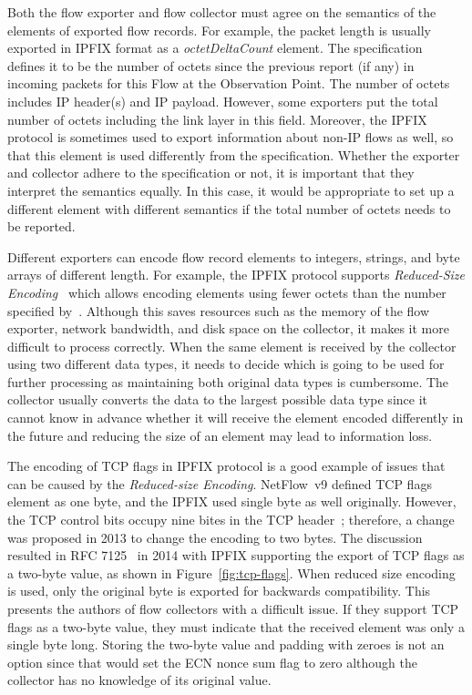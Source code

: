 Both the flow exporter and flow collector must agree on the semantics of the elements of exported flow records. For example, the packet length is usually exported in IPFIX format as a \emph{octetDeltaCount} element. The specification~\cite{IANA-2017-IP} defines it to be the number of octets since the previous report (if any) in incoming packets for this Flow at the Observation Point. The number of octets includes IP header(s) and IP payload. However, some exporters put the total number of octets including the link layer in this field. Moreover, the IPFIX protocol is sometimes used to export information about non-IP flows as well, so that this element is used differently from the specification. Whether the exporter and collector adhere to the specification or not, it is important that they interpret the semantics equally. In this case, it would be appropriate to set up a different element with different semantics if the total number of octets needs to be reported.

Different exporters can encode flow record elements to integers, strings, and byte arrays of different length. For example, the IPFIX protocol supports \emph{Reduced-Size Encoding}~\cite{rfc7011} which allows encoding elements using fewer octets than the number specified by~\cite{IANA-2017-IP}. Although this saves resources such as the memory of the flow exporter, network bandwidth, and disk space on the collector, it makes it more difficult to process correctly. When the same element is received by the collector using two different data types, it needs to decide which is going to be used for further processing as maintaining both original data types is cumbersome. The collector usually converts the data to the largest possible data type since it cannot know in advance whether it will receive the element encoded differently in the future and reducing the size of an element may lead to information loss.

The encoding of TCP flags in IPFIX protocol is a good example of issues that can be caused by the \emph{Reduced-size Encoding}. NetFlow~v9 defined TCP flags element as one byte, and the IPFIX used single byte as well originally. However, the TCP control bits occupy nine bites in the TCP header~\cite{rfc3540}; therefore, a change was proposed in 2013 to change the encoding to two bytes. The discussion resulted in RFC 7125~\cite{rfc7125} in 2014 with IPFIX supporting the export of TCP flags as a two-byte value, as shown in Figure~\ref{fig:tcp-flags}. When reduced size encoding is used, only the original byte is exported for backwards compatibility. This presents the authors of flow collectors with a difficult issue. If they support TCP flags as a two-byte value, they must indicate that the received element was only a single byte long. Storing the two-byte value and padding with zeroes is not an option since that would set the ECN nonce sum flag to zero although the collector has no knowledge of its original value.

